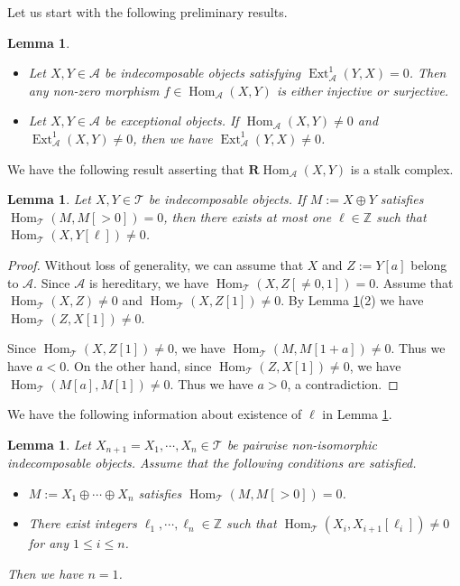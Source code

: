 \documentclass[a4paper,reqno]{amsart}
\newtheorem{lemma}[theorem]{Lemma}
\theoremstyle{definition}
\newcommand{\TT}{{\mathcal T}}
\newcommand{\Z}{\mathbb{Z}}
\newcommand{\Hom}{\operatorname{Hom}\nolimits}
\newcommand{\Ext}{\operatorname{Ext}\nolimits}
\renewcommand{\AA}{{\mathcal A}}
\newcommand{\RHom}{\mathbf{R}\operatorname{Hom}\nolimits}
\begin{document}
Let us start with the following preliminary results.

\begin{lemma}\label{preliminaries}\cite[IV.1.2, IV.1.5]{H}
\begin{itemize}
\item[(1)] Let $X,Y\in\AA$ be indecomposable objects satisfying $\Ext^1_{\AA}(Y,X)=0$.
Then any non-zero morphism $f\in\Hom_{\AA}(X,Y)$ is either injective or surjective.
\item[(2)] Let $X,Y\in\AA$ be exceptional objects.
If $\Hom_{\AA}(X,Y)\neq0$ and $\Ext^1_{\AA}(X,Y)\neq0$, then we have $\Ext^1_{\AA}(Y,X)\neq0$.
\end{itemize}
\end{lemma}

We have the following result asserting that $\RHom_{\AA}(X,Y)$ is a stalk complex.

\begin{lemma}\label{only one extension}
Let $X,Y\in\TT$ be indecomposable objects. If $M:=X\oplus Y$ satisfies
$\Hom_{\TT}(M,M[>0])=0$,
then there exists at most one $\ell\in\Z$ such that $\Hom_{\TT}(X,Y[\ell])\neq0$.
\end{lemma}

\begin{proof}
Without loss of generality, we can assume that $X$ and $Z:=Y[a]$ belong to $\AA$.
Since $\AA$ is hereditary, we have $\Hom_{\TT}(X,Z[\neq0,1])=0$.
Assume that $\Hom_{\TT}(X,Z)\neq0$ and $\Hom_{\TT}(X,Z[1])\neq0$.
By Lemma \ref{preliminaries}(2) we have $\Hom_{\TT}(Z,X[1])\neq0$.

Since $\Hom_{\TT}(X,Z[1])\neq0$, we have $\Hom_{\TT}(M,M[1+a])\neq0$.
Thus we have $a<0$.
On the other hand, since $\Hom_{\TT}(Z,X[1])\neq0$, we have
$\Hom_{\TT}(M[a],M[1])\neq0$. Thus we have $a>0$, a contradiction.
\end{proof}

We have the following information about existence of $\ell$ in Lemma \ref{only one extension}.

\begin{lemma}\label{no cycle}
Let $X_{n+1}=X_1,\cdots,X_n\in\TT$ be pairwise non-isomorphic indecomposable objects.
Assume that the following conditions are satisfied.
\begin{itemize}
\item[(i)] $M:=X_1\oplus\cdots\oplus X_n$ satisfies $\Hom_{\TT}(M,M[>0])=0$.
\item[(ii)] There exist integers $\ell_1,\cdots,\ell_n\in\Z$ such that
$\Hom_{\TT}(X_i,X_{i+1}[\ell_i])\neq0$ for any $1\le i\le n$.
\end{itemize}
Then we have $n=1$.
\end{lemma}
\end{document}
